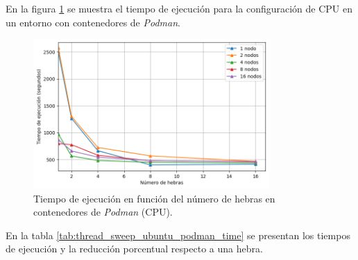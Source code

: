 En la figura \ref{fig:thread_sweep_ubuntu_podman_time} se muestra el tiempo de ejecución para la configuración de CPU en un entorno con contenedores de \textit{Podman}.

\begin{figure}[ht]
    \centering
    \includegraphics[width=0.8\textwidth]{imagenes/cap5/thread_sweep_ubuntu_podman_time.png}
    \caption{Tiempo de ejecución en función del número de hebras en contenedores de \textit{Podman} (CPU).}
    \label{fig:thread_sweep_ubuntu_podman_time}
\end{figure}

En la tabla \ref{tab:thread_sweep_ubuntu_podman_time} se presentan los tiempos de ejecución y la reducción porcentual respecto a una hebra.

